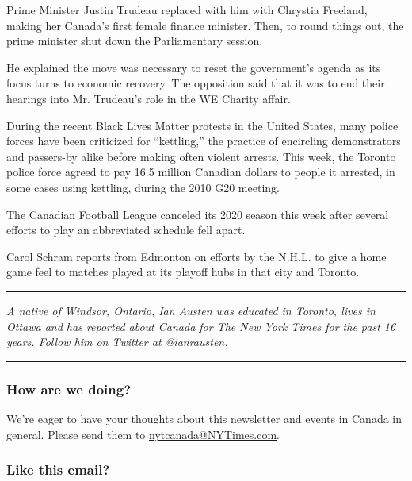 Prime Minister Justin Trudeau replaced with him with Chrystia Freeland,
making her Canada's first female finance minister. Then, to round things
out, the prime minister shut down the Parliamentary session.

He explained the move was necessary to reset the government's agenda as
its focus turns to economic recovery. The opposition said that it was to
end their hearings into Mr. Trudeau's role in the WE Charity affair.

During the recent Black Lives Matter protests in the United States, many
police forces have been criticized for ``kettling,'' the practice of
encircling demonstrators and passers-by alike before making often
violent arrests. This week, the Toronto police force agreed to pay 16.5
million Canadian dollars to people it arrested, in some cases using
kettling, during the 2010 G20 meeting.

The Canadian Football League canceled its 2020 season this week after
several efforts to play an abbreviated schedule fell apart.

Carol Schram reports from Edmonton on efforts by the N.H.L. to give a
home game feel to matches played at its playoff hubs in that city and
Toronto.

\begin{center}\rule{0.5\linewidth}{\linethickness}\end{center}

\emph{A native of Windsor, Ontario, Ian Austen was educated in Toronto,
lives in Ottawa and has reported about Canada for The New York Times for
the past 16 years. Follow him on Twitter at @ianrausten.}

\begin{center}\rule{0.5\linewidth}{\linethickness}\end{center}

\hypertarget{how-are-we-doing}{%
\subsubsection{\texorpdfstring{\textbf{How are we
doing?}}{How are we doing?}}\label{how-are-we-doing}}

We're eager to have your thoughts about this newsletter and events in
Canada in general. Please send them to
\href{mailto:nytcanada@NYTimes.com?\%20subject=Canada\%20Letter\%20Newsletter\%20Feedback}{nytcanada@NYTimes.com}.

\hypertarget{like-this-email}{%
\subsubsection{\texorpdfstring{\textbf{Like this
email?}}{Like this email?}}\label{like-this-email}}

